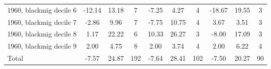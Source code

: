 \begin{table}[htbp]
\begin{tabular}{l*{3}{ccc}}
1960, blackmig decile 6&      -12.14&       13.18&           7&       -7.25&        4.27&           4&      -18.67&       19.55&           3\\
1960, blackmig decile 7&       -2.86&        9.96&           7&       -7.75&       10.75&           4&        3.67&        3.51&           3\\
1960, blackmig decile 8&        1.17&       22.22&           6&       10.33&       26.27&           3&       -8.00&       17.09&           3\\
1960, blackmig decile 9&        2.00&        4.75&           8&        2.00&        3.74&           4&        2.00&        6.22&           4\\
Total               &       -7.57&       24.87&         192&       -7.64&       28.41&         102&       -7.50&       20.27&          90\\
\bottomrule
\end{tabular}
\end{table}
